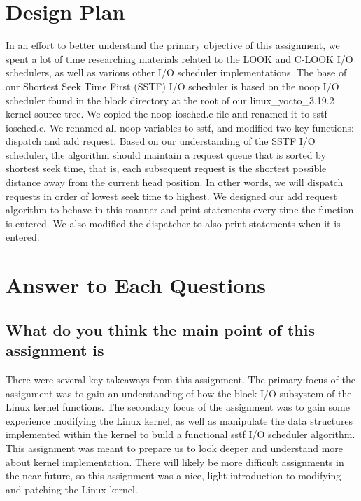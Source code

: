 \documentclass[onecolumn, draftclsnofoot,10pt, compsoc]{IEEEtran}
\begin{document}
\section{Design Plan}
\noindent
In an effort to better understand the primary objective of this assignment, we spent a lot of time researching materials related to the LOOK and C-LOOK I/O schedulers, as well as various other I/O scheduler implementations. The base of our Shortest Seek Time First (SSTF) I/O scheduler is based on the noop I/O scheduler found in the block directory at the root of our linux\_yocto\_3.19.2 kernel source tree. We copied the noop-iosched.c file and renamed it to sstf-iosched.c. We renamed all noop variables to sstf, and modified two key functions: dispatch and add request. Based on our understanding of the SSTF I/O scheduler, the algorithm should maintain a request queue that is sorted by shortest seek time, that is, each subsequent request is the shortest possible distance away from the current head position. In other words, we will dispatch requests in order of lowest seek time to highest. We designed our add request algorithm to behave in this manner and print statements every time the function is entered. We also modified the dispatcher to also print statements when it is entered.
\\

\section{Answer to Each Questions }
\subsection{What do you think the main point of this assignment is}

\noindent 
There were several key takeaways from this assignment. The primary focus of the assignment was to gain an understanding of how the block I/O subsystem of the Linux kernel functions. The secondary focus of the assignment was to gain some experience modifying the Linux kernel, as well as manipulate the data structures implemented within the kernel to build a functional sstf I/O scheduler algorithm. This assignment was meant to prepare us to look deeper and understand more about kernel implementation. There will likely be more difficult assignments in the near future, so this assignment was a nice, light introduction to modifying and patching the Linux kernel.
\\
\end{document}
